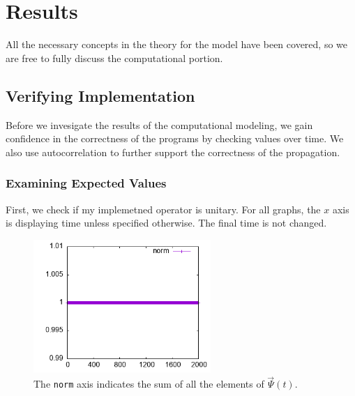 \documentclass[letterpaper,12pt]{article}
\begin{document}
    \newpage

    \section*{Results}
    \label{sec:Results}

    All the necessary concepts in the theory for the model have been covered,
    so we are free to fully discuss the computational portion.

    \subsection*{Verifying Implementation}
    \label{subsec:verify}

    Before we invesigate the results of the computational modeling, we gain
    confidence in the correctness of the programs by checking values over time.
    We also use autocorrelation to further support the correctness of the
    propagation.

    \subsubsection*{Examining Expected Values}

    First, we check if my implemetned operator is unitary.
    For all graphs, the $x$ axis is displaying time unless specified otherwise.
    The final time is not changed.

    \begin{figure}[H]
        \centering
        \includegraphics[width=0.6\textwidth]{norm.png}
        \caption[Squared Magnitude of the Wave Function over Time]{The
        \texttt{norm} axis indicates the sum of all the elements of
        $\vec{\Psi}(t)$.}
    \end{figure}
\end{document}
